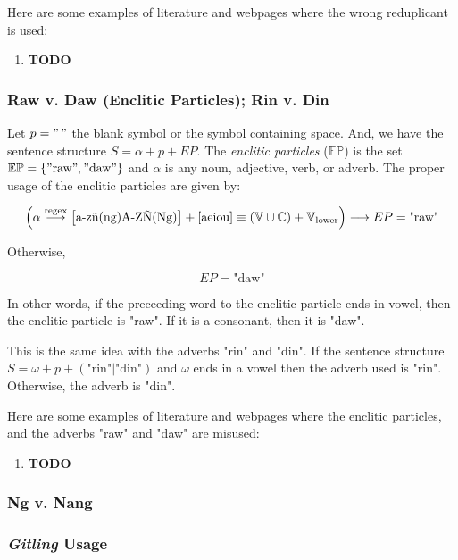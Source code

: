\begin{example}
    Here are some examples of literature and webpages where the wrong reduplicant is
    used:
\end{example}
\begin{enumerate}
    \item \textbf{TODO}
\end{enumerate}

\subsubsection{Raw v. Daw (Enclitic Particles); Rin v. Din}

Let \(p = "\,"\) the blank symbol or the symbol containing space. And, we have the
sentence structure \(S = \alpha + p + EP\). The \textit{enclitic particles}
(\(\mathbb{EP}\)) is the set \(\mathbb{EP} = \{"\text{raw}", "\text{daw}"\}\) and
\(\alpha\) is any noun, adjective, verb, or adverb. The proper usage of the enclitic
particles are given by:

\[
    \left(\alpha \overset{\text{regex}}{\longrightarrow} \left[\text{a-zñ(ng)A-ZÑ(Ng)}\right]+\left[\text{aeiou}\right] \equiv (\mathbb{V}\cup\mathbb{C}) + \mathbb{V}_\text{lower}\right)
    \longrightarrow EP = \text{"raw"}
\]

Otherwise,

\[
    EP = \text{"daw"}
\]

In other words, if the preceeding word to the enclitic particle ends in vowel,
then the enclitic particle is "raw". If it is a consonant, then it is "daw".

This is the same idea with the adverbs "rin" and "din". If the sentence structure
\(S = \omega + p + (\text{"rin"}|\text{"din"})\) and \(\omega\) ends in a vowel
then the adverb used is "rin". Otherwise, the adverb is "din".

Here are some examples of literature and webpages where the enclitic particles,
and the adverbs "raw" and "daw" are misused:
\begin{enumerate}
    \item \textbf{TODO}
\end{enumerate}

\subsubsection{Ng v. Nang}

\subsubsection{\textit{Gitling} Usage}\texttt{}